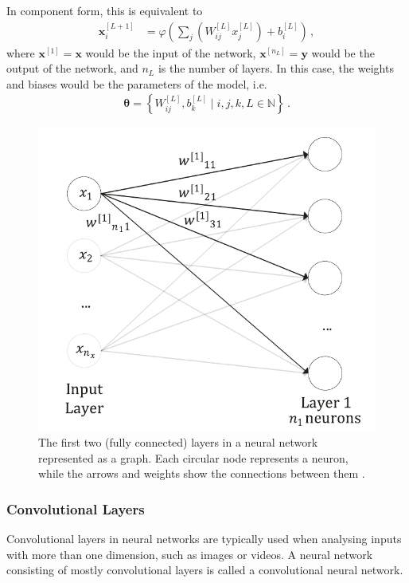 \documentclass[11pt,a4paper,onecolumn]{report}
\begin{document}
\noindent In component form, this is equivalent to
\begin{align}
  \label{eqn:component_repr}
  \bm{x}^{[L+1]}_i
  &= \varphi \left(\sum\limits_j \left(W^{[L]}_{ij}x^{[L]}_j\right) + b^{[L]}_i\right)\,,
\end{align}
where \(\bm{x}^{[1]} = \bm{x}\) would be the input of the network,
\(\bm{x}^{[n_L]} = \bm{y}\) would be the output of the network, and \(n_L\) is
the number of layers. In this case, the weights and biases would be the
parameters of the model, i.e.
\begin{align*}
  \bm{\theta} = \left\{W_{ij}^{[L]}, b_{k}^{[L]} \mid i, j, k, L \in \mathbb{N} \right\}\,.
\end{align*}

\begin{figure}[t]
  \centering
  \includegraphics[width=0.5\linewidth]{ann.png}
  \caption{The first two (fully connected) layers in a neural network
  represented as a graph. Each circular node represents a neuron, while the
  arrows and weights show the connections between them \citep{michelucci2018}.}
  \label{fig:fully_connected}
\end{figure}

\subsubsection{Convolutional Layers}
\label{sec:convolutional}
Convolutional layers in neural networks are typically used when analysing inputs
with more than one dimension, such as images or videos. A neural network
consisting of mostly convolutional layers is called a convolutional neural
network. \\
\end{document}
